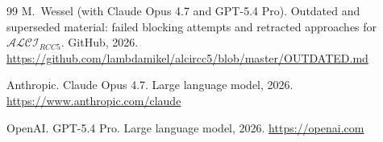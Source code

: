 \documentclass[
]{ceurart}
\theoremstyle{definition}
\newcommand{\ALCIRCC}[1]{\ensuremath{\mathcal{ALCI}_{\mathit{RCC#1}}}}
\begin{document}
\begin{thebibliography}{99}
M.\ Wessel (with Claude Opus 4.7 and GPT-5.4 Pro).
\newblock Outdated and superseded material: failed blocking
  attempts and retracted approaches for $\ALCIRCC{5}$.
\newblock GitHub, 2026.
\newblock \url{https://github.com/lambdamikel/alcircc5/blob/master/OUTDATED.md}

Anthropic.
\newblock Claude Opus 4.7.
\newblock Large language model, 2026.
\newblock \url{https://www.anthropic.com/claude}

OpenAI.
\newblock GPT-5.4 Pro.
\newblock Large language model, 2026.
\newblock \url{https://openai.com}

\end{thebibliography}
\end{document}
